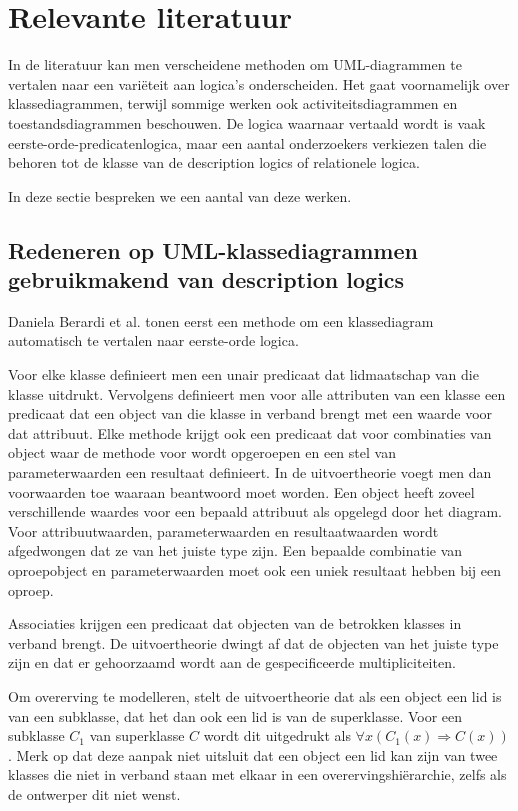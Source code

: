 \chapter{Relevante literatuur}\label{sec:literatuur}
In de literatuur kan men verscheidene methoden om UML-diagrammen te vertalen naar een vari\"eteit aan logica's onderscheiden. Het gaat voornamelijk over klassediagrammen, terwijl sommige werken ook activiteitsdiagrammen en toestandsdiagrammen beschouwen. De logica waarnaar vertaald wordt is vaak eerste-orde-predicatenlogica, maar een aantal onderzoekers verkiezen talen die behoren tot de klasse van de description logics of relationele logica.

In deze sectie bespreken we een aantal van deze werken.

\section{Redeneren op UML-klassediagrammen gebruikmakend van description logics}
Daniela Berardi et al.\cite{BerardiDaniela2005RoUc} tonen eerst een methode om een klassediagram automatisch te vertalen naar eerste-orde logica.

Voor elke klasse definieert men een unair predicaat dat lidmaatschap van die klasse uitdrukt. Vervolgens definieert men voor alle attributen van een klasse een predicaat dat een object van die klasse in verband brengt met een waarde voor dat attribuut. Elke methode krijgt ook een predicaat dat voor combinaties van object waar de methode voor wordt opgeroepen en een stel van parameterwaarden een resultaat definieert. In de uitvoertheorie voegt men dan voorwaarden toe waaraan beantwoord moet worden. Een object heeft zoveel verschillende waardes voor een bepaald attribuut als opgelegd door het diagram. Voor attribuutwaarden, parameterwaarden en resultaatwaarden wordt afgedwongen dat ze van het juiste type zijn. Een bepaalde combinatie van oproepobject en parameterwaarden moet ook een uniek resultaat hebben bij een oproep.

Associaties krijgen een predicaat dat objecten van de betrokken klasses in verband brengt. De uitvoertheorie dwingt af dat de objecten van het juiste type zijn en dat er gehoorzaamd wordt aan de gespecificeerde multipliciteiten.

Om overerving te modelleren, stelt de uitvoertheorie dat als een object een lid is van een subklasse, dat het dan ook een lid is van de superklasse. Voor een subklasse $C_1$ van superklasse $C$ wordt dit uitgedrukt als $\forall{x}(C_1(x) \Rightarrow C(x))$. Merk op dat deze aanpak niet uitsluit dat een object een lid kan zijn van twee klasses die niet in verband staan met elkaar in een overervingshi\"erarchie, zelfs als de ontwerper dit niet wenst.

